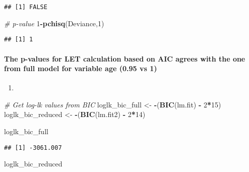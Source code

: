 \documentclass[]{article}
\newenvironment{Shaded}{\begin{snugshade}}{\end{snugshade}}
\newcommand{\CommentTok}[1]{\textcolor[rgb]{0.56,0.35,0.01}{\textit{#1}}}
\newcommand{\DecValTok}[1]{\textcolor[rgb]{0.00,0.00,0.81}{#1}}
\newcommand{\KeywordTok}[1]{\textcolor[rgb]{0.13,0.29,0.53}{\textbf{#1}}}
\newcommand{\NormalTok}[1]{#1}
\newcommand{\OperatorTok}[1]{\textcolor[rgb]{0.81,0.36,0.00}{\textbf{#1}}}
\newcommand{\StringTok}[1]{\textcolor[rgb]{0.31,0.60,0.02}{#1}}
\let\oldparagraph\paragraph
\renewcommand{\paragraph}[1]{\oldparagraph{#1}\mbox{}}
\begin{document}
\begin{verbatim}
## [1] FALSE
\end{verbatim}

\begin{Shaded}
\begin{Highlighting}[]
\CommentTok{# p-value}
\DecValTok{1}\OperatorTok{-}\KeywordTok{pchisq}\NormalTok{(Deviance,}\DecValTok{1}\NormalTok{)}
\end{Highlighting}
\end{Shaded}

\begin{verbatim}
## [1] 1
\end{verbatim}

\hypertarget{the-p-values-for-let-calculation-based-on-aic-agrees-with-the-one-from-full-model-for-variable-age-0.95-vs-1}{%
\paragraph{The p-values for LET calculation based on AIC agrees with the
one from full model for variable age (0.95 vs
1)}\label{the-p-values-for-let-calculation-based-on-aic-agrees-with-the-one-from-full-model-for-variable-age-0.95-vs-1}}

\begin{enumerate}
\def\labelenumi{(\alph{enumi})}
\setcounter{enumi}{2}
\item
\end{enumerate}

\begin{Shaded}
\begin{Highlighting}[]
\CommentTok{# Get log-lk values from BIC}
\NormalTok{loglk_bic_full <-}\StringTok{ }\OperatorTok{-}\NormalTok{(}\KeywordTok{BIC}\NormalTok{(lm.fit) }\OperatorTok{-}\StringTok{ }\DecValTok{2}\OperatorTok{*}\DecValTok{15}\NormalTok{)}
\NormalTok{loglk_bic_reduced <-}\StringTok{ }\OperatorTok{-}\NormalTok{(}\KeywordTok{BIC}\NormalTok{(lm.fit2) }\OperatorTok{-}\StringTok{ }\DecValTok{2}\OperatorTok{*}\DecValTok{14}\NormalTok{)}

\NormalTok{loglk_bic_full}
\end{Highlighting}
\end{Shaded}

\begin{verbatim}
## [1] -3061.007
\end{verbatim}

\begin{Shaded}
\begin{Highlighting}[]
\NormalTok{loglk_bic_reduced}
\end{Highlighting}
\end{Shaded}
\end{document}
